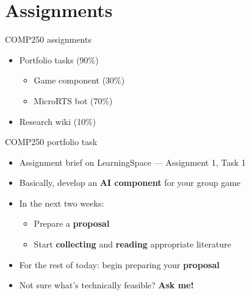 \part{Assignments}
\frame{\partpage}

\begin{frame}{COMP250 assignments}
	\begin{itemize}
		\pause\item Portfolio tasks (90\%)
			\begin{itemize}
				\pause\item Game component (30\%)
				\pause\item MicroRTS bot (70\%)
			\end{itemize}
		\pause\item Research wiki (10\%)
	\end{itemize}
\end{frame}

\begin{frame}{COMP250 portfolio task}
	\begin{itemize}
		\pause\item Assignment brief on LearningSpace --- Assignment 1, Task 1
		\pause\item Basically, develop an \textbf{AI component} for your group game
		\pause\item In the next two weeks:
			\begin{itemize}
				\pause\item Prepare a \textbf{proposal}
				\pause\item Start \textbf{collecting} and \textbf{reading} appropriate literature
			\end{itemize}
		\pause\item For the rest of today: begin preparing your \textbf{proposal}
		\pause\item Not sure what's technically feasible? \textbf{Ask me!}
	\end{itemize}
\end{frame}

